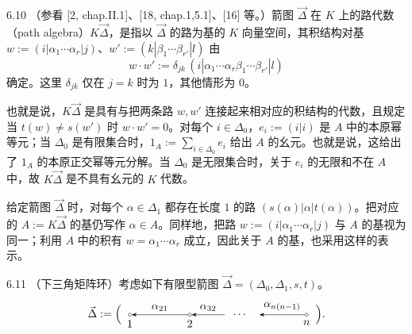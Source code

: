 \begin{definition}{6.10}
（参看 [2, chap.II.1]、[18, chap.1,5.1]、[16] 等。）箭图 $\vec{\Delta}$ 在 $K$ 上的路代数（path algebra）$K\vec{\Delta}$，是指以 $\vec{\Delta}$ 的路为基的 $K$ 向量空间，其积结构对基 $w:=(i|\alpha_1\cdots\alpha_r|j)$、$w':=(k|\beta_1\cdots\beta_{r'}|l)$ 由
\[
w\cdot w' := \delta_{jk}\,(i|\alpha_1\cdots\alpha_r\beta_1\cdots\beta_{r'}|l)
\]
确定。这里 $\delta_{jk}$ 仅在 $j=k$ 时为 $1$，其他情形为 $0$。
\end{definition}

也就是说，$K\vec{\Delta}$ 是具有与把两条路 $w,w'$ 连接起来相对应的积结构的代数，且规定当 $t(w)\neq s(w')$ 时 $w\cdot w'=0$。对每个 $i\in\Delta_0$，$e_i:=(i|i)$ 是 $A$ 中的本原幂等元；当 $\Delta_0$ 是有限集合时，$1_A:=\sum_{i\in\Delta_0}e_i$ 给出 $A$ 的幺元。也就是说，这给出了 $1_A$ 的本原正交幂等元分解。当 $\Delta_0$ 是无限集合时，关于 $e_i$ 的无限和不在 $A$ 中，故 $K\vec{\Delta}$ 是不具有幺元的 $K$ 代数。

给定箭图 $\vec{\Delta}$ 时，对每个 $\alpha\in\Delta_1$ 都存在长度 $1$ 的路 $(s(\alpha)|\alpha|t(\alpha))$。把对应的 $A:=K\vec{\Delta}$ 的基仍写作 $\alpha\in A$。同样地，把路 $w:=(i|\alpha_1\cdots\alpha_r|j)$ 与 $A$ 的基视为同一；利用 $A$ 中的积有 $w=\alpha_1\cdots\alpha_r$ 成立，因此关于 $A$ 的基，也采用这样的表示。

\begin{example}{6.11}
（下三角矩阵环）考虑如下有限型箭图 $\vec{\Delta}=(\Delta_0,\Delta_1,s,t)$。
\[
\vec{\Delta} := \Bigl(\,
\begin{tikzpicture}[baseline=-0.5ex]
  \node[draw,circle,inner sep=1pt,label=below:{$1$}] (v1) at (0,0) {};
  \node[draw,circle,inner sep=1pt,label=below:{$2$}] (v2) at (1.9,0) {};
  \node at (3.5,0) {$\cdots$};
  \node[draw,circle,inner sep=1pt,label=below:{$n$}] (vn) at (5.6,0) {};
  \draw[-{Stealth}] (v2) -- node[above]{$\alpha_{21}$} (v1);
  \draw[-{Stealth}] (3.0,0) -- node[above]{$\alpha_{32}$} (v2);
  \draw[-{Stealth}] (vn) -- node[above]{$\alpha_{n(n-1)}$} (4.1,0);
\end{tikzpicture}
\,\Bigr).
\]
\end{example}

